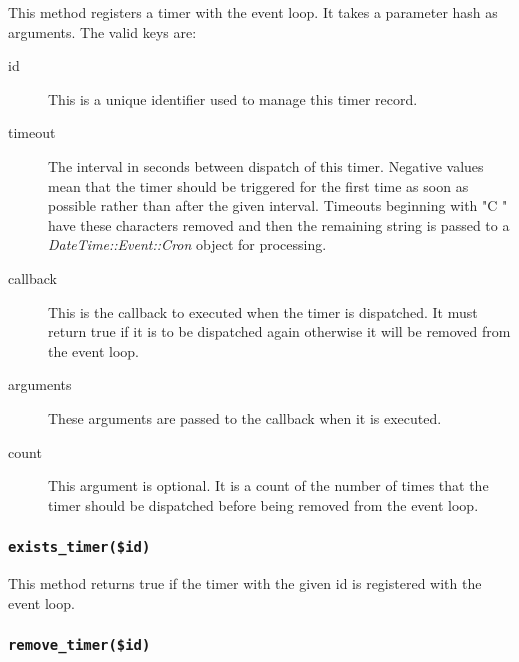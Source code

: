 \documentclass[12pt,a4paper]{article}
\begin{document}
This method registers a timer with the event loop.  It takes a parameter
hash as arguments.  The valid keys are:

\begin{description}

\item[{id}] \mbox{}

This is a unique identifier used to manage this timer record.


\item[{timeout}] \mbox{}

The interval in seconds between dispatch of this timer.  Negative
values mean that the timer should be triggered for the first time as
soon as possible rather than after the given interval.  Timeouts
beginning with "C " have these characters removed and then the
remaining string is passed to a \emph{DateTime::Event::Cron} object for
processing.


\item[{callback}] \mbox{}

This is the callback to executed when the timer is dispatched.
It must return true if it is to be dispatched again otherwise
it will be removed from the event loop.


\item[{arguments}] \mbox{}

These arguments are passed to the callback when it is executed.


\item[{count}] \mbox{}

This argument is optional.  It is a count of the number of times
that the timer should be dispatched before being removed from the event
loop.

\end{description}
\subsubsection*{\texttt{exists\_timer(\$id)}\label{xPL::Listener_exists_timer_id_}}


This method returns true if the timer with the given id is registered
with the event loop.

\subsubsection*{\texttt{remove\_timer(\$id)}\label{xPL::Listener_remove_timer_id_}}
\end{document}
